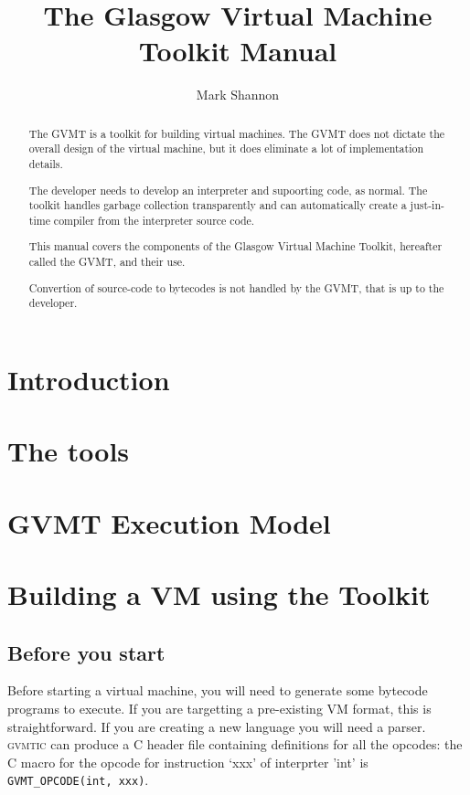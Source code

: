 \documentclass[a4paper,12pt]{report}
\title{The Glasgow Virtual Machine Toolkit Manual}
\author{Mark Shannon}
\date{ }
\newcommand{\gvmtic}{\textsc{gvmtic}}
\begin{document}
\maketitle 

\begin{abstract}
The GVMT is a toolkit for building virtual machines. The GVMT does not dictate the overall design of the virtual machine, but it does eliminate a lot of implementation details. 

The developer needs to develop an interpreter and supoorting code, as normal. The toolkit handles garbage collection transparently
and can automatically create a just-in-time compiler from the interpreter source code.

This manual covers the components of the Glasgow Virtual Machine Toolkit, hereafter called the GVMT, and their use. 

Convertion of source-code to bytecodes is not handled by the GVMT, that is up to the developer.

\tableofcontents

\end{abstract}


\chapter{Introduction}



\chapter{The tools\label{chap:tools}}



\chapter{GVMT Execution Model\label{chap:abstract}}



\chapter{Building a VM using the Toolkit}

\section{Before you start}
Before starting a virtual machine, you will need to generate some bytecode programs to execute. If you are targetting a pre-existing VM format, this is straightforward. If you are creating a new language you will need a parser. \gvmtic{} can produce a C header file containing definitions for all the opcodes: the C macro for the opcode for instruction `xxx' of interprter 'int' is \verb|GVMT_OPCODE(int, xxx)|.
\end{document}
